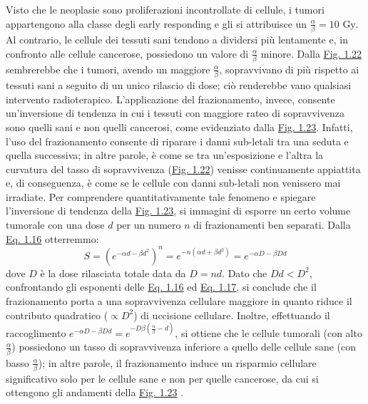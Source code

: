 \documentclass[12pt,a4paper,twoside]{report}
\begin{document}
	Visto che le neoplasie sono proliferazioni incontrollate di cellule, i tumori appartengono alla classe degli early responding e gli si attribuisce un $\frac{\alpha}{\beta}=10\mbox{ Gy}$. Al contrario, le cellule dei tessuti sani tendono a dividersi più lentamente e, in confronto alle cellule cancerose, possiedono un valore di $\frac{\alpha}{\beta}$ minore. Dalla \hyperref[fig:survival_cell]{Fig. 1.22} sembrerebbe che i tumori, avendo un maggiore $\frac{\alpha}{\beta}$, sopravvivano di più rispetto ai tessuti sani a seguito di un unico rilascio di dose; ciò renderebbe vano qualsiasi intervento radioterapico. L'applicazione del frazionamento, invece, consente un'inversione di tendenza in cui i tessuti con maggiore rateo di sopravvivenza sono quelli sani e non quelli cancerosi, come evidenziato dalla \hyperref[fig:sparing]{Fig. 1.23}. Infatti, l'uso del frazionamento consente di riparare i danni sub-letali tra una seduta e quella successiva; in altre parole, è come se tra un'esposizione e l'altra la curvatura del tasso di sopravvivenza (\hyperref[fig:survival_cell]{Fig. 1.22}) venisse continuamente appiattita e, di conseguenza, è come se le cellule con danni sub-letali non venissero mai irradiate. Per comprendere quantitativamente tale fenomeno e spiegare l'inversione di tendenza della \hyperref[fig:sparing]{Fig. 1.23}, si immagini di esporre un certo volume tumorale con una dose $d$ per un numero $n$ di frazionamenti ben separati. Dalla \hyperref[eq:survival2]{Eq. 1.16} otterremmo:
	\begin{equation}
		S=\left(e^{-\alpha d-\beta d^2}\right)^n=e^{-n\left(\alpha d+\beta d^2\right)}=e^{-\alpha D-\beta Dd}
		\label{eq:survival3}
	\end{equation}
	dove $D$ è la dose rilasciata totale data da $D=nd$. Dato che $Dd<D^2$, confrontando gli esponenti delle \hyperref[eq:survival2]{Eq. 1.16} ed \hyperref[eq:survival3]{Eq. 1.17}, si conclude che il frazionamento porta a una sopravvivenza cellulare maggiore in quanto riduce il contributo quadratico ($\propto D^2$) di uccisione cellulare. Inoltre, effettuando il raccoglimento $e^{-\alpha D-\beta Dd}=e^{-D\beta\left(\frac{\alpha}{\beta}-d\right)}$, si ottiene che le cellule tumorali (con alto $\frac{\alpha}{\beta}$) possiedono un tasso di sopravvivenza inferiore a quello delle cellule sane (con basso $\frac{\alpha}{\beta}$); in altre parole, il frazionamento induce un risparmio cellulare significativo solo per le cellule sane e non per quelle cancerose, da cui si ottengono gli andamenti della \hyperref[fig:sparing]{Fig. 1.23} \cite{McMahon_2019,WILLIAMS198587}.
\end{document}
